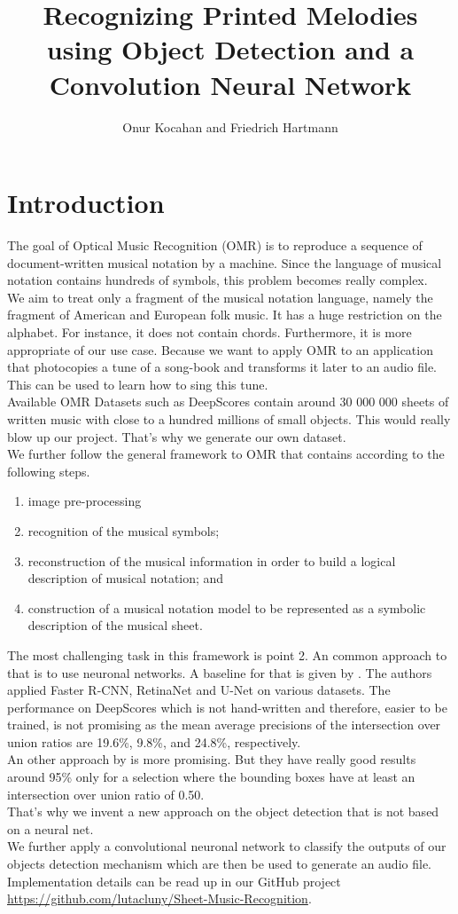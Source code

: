 \documentclass[twocolumn]{article}
\title{Recognizing Printed Melodies using Object Detection and a Convolution Neural Network}
\author{Onur Kocahan and Friedrich Hartmann}
\begin{document}
 
\maketitle
\section{Introduction}
The goal of Optical Music Recognition (OMR) is to reproduce a sequence of document-written musical notation by a machine. Since the language of musical notation contains hundreds of symbols, this problem becomes really complex. \\
We aim to treat only a fragment of the musical notation language, namely the fragment of American and European folk music. It has a huge restriction on the alphabet. For instance, it does not contain chords. Furthermore, it is more appropriate of our use case. Because we want to apply OMR to an application that photocopies a tune of a song-book and transforms it later to an audio file. This can be used to learn how to sing this tune.  \\
Available OMR Datasets such as DeepScores \citep{DeepScores} contain around 30 000 000 sheets of written music with close to a hundred millions of small objects. This would really blow up our project. That's why we generate our own dataset. \\
We further follow the general framework to OMR that contains according to \citet{state_of_the_art} the following steps. 
\begin{enumerate}
 \item image pre-processing
 \item recognition of the musical symbols;
 \item reconstruction of the musical information in order to build a logical description of musical notation; and
 \item construction of a musical notation model to be represented as a symbolic description of the musical sheet.
\end{enumerate}
The most challenging task in this framework is point 2. An common approach to that is to use neuronal networks. A baseline for that is given by \citet{Baseline}. The authors applied Faster R-CNN, RetinaNet and U-Net on various datasets. The performance on DeepScores which is not hand-written and therefore, easier to be trained, is not promising as the mean average precisions of the intersection over union ratios are 19.6\%, 9.8\%, and 24.8\%, respectively. \\
An other approach by \citet{GitHub_OMR} is more promising. But they have really good results around 95\% only for a selection where the bounding boxes have at least an intersection over union ratio of 0.50. \\
That's why we invent a new approach on the object detection that is not based on a neural net.\\ We further apply a convolutional neuronal network to classify the outputs of our objects detection mechanism which are then be used to generate an audio file. \\
Implementation details can be read up in our GitHub project \url{https://github.com/lutacluny/Sheet-Music-Recognition}.
\end{document}
